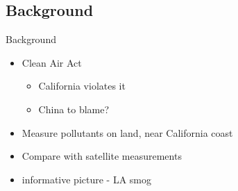 \documentclass[notheorems,envcountsect,allowframebreaks,xcolor=svgnames,8pt]{beamer}
\begin{document}
%
%
\subsection*{Background}
\begin{frame}{Background}
\begin{itemize}

\item Clean Air Act
\begin{itemize}
\item California violates it
\item China to blame?
\end{itemize}
\item Measure pollutants on land, near California coast
\item Compare with satellite measurements
\item informative picture - LA smog
\end{itemize}
\end{frame}
\end{document}
